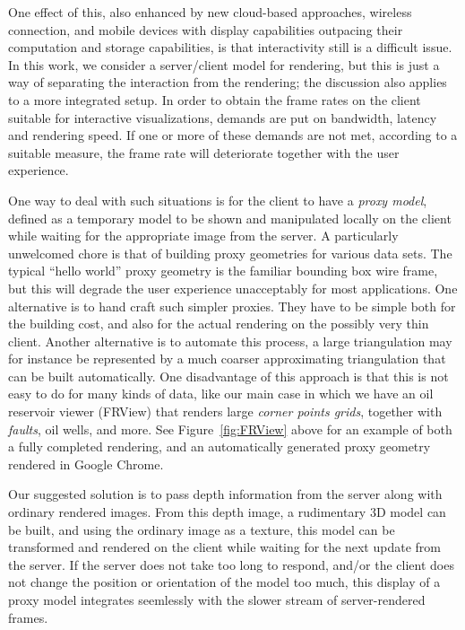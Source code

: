One effect of this, also enhanced by new cloud-based approaches, wireless
connection, and mobile devices with display capabilities outpacing their
computation and storage capabilities, is that interactivity still is a difficult
issue. In this work, we consider a server/client model for rendering, but this
is just a way of separating the interaction from the rendering; the discussion
also applies to a more integrated setup.  In order to obtain the frame rates on
the client suitable for interactive visualizations, demands are put on
bandwidth, latency and rendering speed. If one or more of these demands are not
met, according to a suitable measure, the frame rate will deteriorate together
with the user experience.

One way to deal with such situations is for the client to have a {\em
proxy model}, defined as a temporary model to be shown and manipulated
locally on the client while waiting for the appropriate image from the server.
A particularly unwelcomed chore is that of building proxy geometries for various
data sets. The typical ``hello world'' proxy geometry is the familiar bounding
box wire frame, but this will degrade the user experience unacceptably for most
applications. One alternative is to hand craft such simpler proxies. They have
to be simple both for the building cost, and also for the actual rendering on
the possibly very thin client. Another alternative is to automate this process,
a large triangulation may for instance be represented by a much coarser
approximating triangulation that can be built automatically. One disadvantage of
this approach is that this is not easy to do for many kinds of data, like our
main case in which we have an oil reservoir viewer (FRView) that renders large
{\em corner points grids}, together with {\em faults}, oil wells, and more. See
Figure~\ref{fig:FRView} above for an example of both a fully completed
rendering, and an automatically generated proxy geometry rendered in Google
Chrome.

Our suggested solution is to pass depth information from the server along with
ordinary rendered images. From this depth image, a rudimentary 3D model can be
built, and using the ordinary image as a texture, this model can be transformed
and rendered on the client while waiting for the next update from the server. If
the server does not take too long to respond, and/or the client does not change
the position or orientation of the model too much, this display of a proxy model
integrates seemlessly with the slower stream of server-rendered frames.

